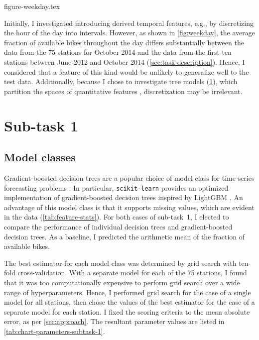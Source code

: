 \documentclass[11pt]{extarticle}
\begin{document}
{figure-weekday.tex}

Initially, I investigated introducing derived temporal features, e.g., by discretizing
the hour of the day into intervals.
However, as shown in \cref{fig:weekday}, the average fraction of available bikes
throughout the day differs substantially between the data from the 75 stations for
October 2014 and the data from the first ten stations between June 2012 and October
2014 (\cref{sec:task-description}).
Hence, I considered that a feature of this kind would be unlikely to generalize well to
the test data.
Additionally, because I chose to investigate tree models (\cref{sec:subtask-1}), which
partition the spaces of quantitative features \parencite[155]{Flach2012},
discretization may be irrelevant.

\section{Sub-task 1}
\label{sec:subtask-1}

\subsection{Model classes}
\label{sec:subtask-1:model-classes}

Gradient-boosted decision trees are a popular choice of model class for time-series
forecasting problems \parencite{Bojer2021}.
In particular, \texttt{scikit-learn} provides an optimized implementation of
gradient-boosted decision trees inspired by LightGBM \parencite{Ke2017}.
An advantage of this model class is that it supports missing values, which are evident
in the data (\cref{tab:feature-stats}).
For both cases of sub-task~1, I elected to compare the performance of individual
decision trees and gradient-boosted decision trees.
As a baseline, I predicted the arithmetic mean of the fraction of available bikes.

The best estimator for each model class was determined by grid search with ten-fold
cross-validation.
With a separate model for each of the 75 stations, I found that it was too
computationally expensive to perform grid search over a wide range of hyperparameters.
Hence, I performed grid search for the case of a single model for all stations, then
chose the values of the best estimator for the case of a separate model for each
station.
I fixed the scoring criteria to the mean absolute error, as per \cref{sec:approach}.
The resultant parameter values are listed in \cref{tab:chart-parameters-subtask-1}.
\end{document}
